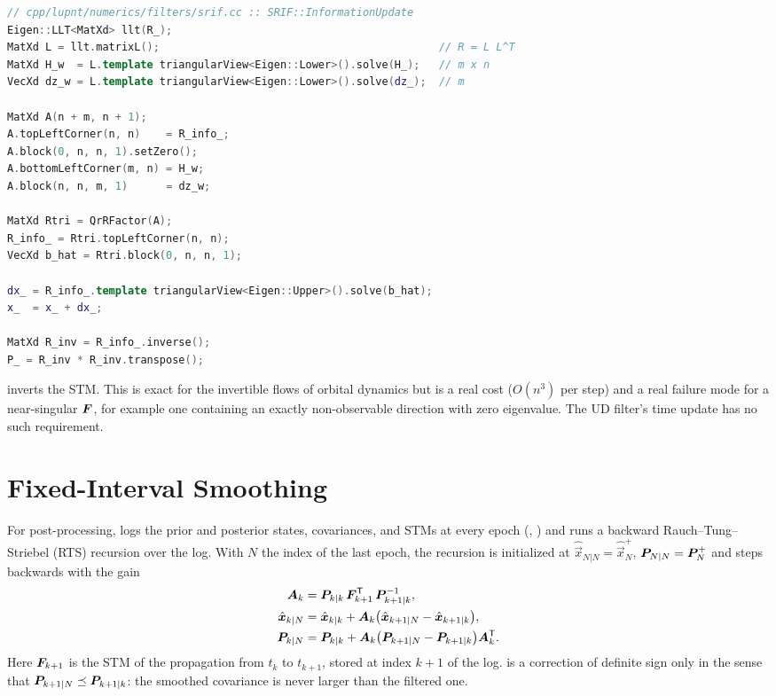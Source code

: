 \begin{lstlisting}[language=cpp, caption={SRIF Householder information update.},
                   label={lst:flt-srif-update}]
// cpp/lupnt/numerics/filters/srif.cc :: SRIF::InformationUpdate
Eigen::LLT<MatXd> llt(R_);
MatXd L = llt.matrixL();                                            // R = L L^T
MatXd H_w  = L.template triangularView<Eigen::Lower>().solve(H_);   // m x n
VecXd dz_w = L.template triangularView<Eigen::Lower>().solve(dz_);  // m

MatXd A(n + m, n + 1);
A.topLeftCorner(n, n)    = R_info_;
A.block(0, n, n, 1).setZero();
A.bottomLeftCorner(m, n) = H_w;
A.block(n, n, m, 1)      = dz_w;

MatXd Rtri = QrRFactor(A);
R_info_ = Rtri.topLeftCorner(n, n);
VecXd b_hat = Rtri.block(0, n, n, 1);

dx_ = R_info_.template triangularView<Eigen::Upper>().solve(b_hat);
x_  = x_ + dx_;

MatXd R_inv = R_info_.inverse();
P_ = R_inv * R_inv.transpose();
\end{lstlisting}

\begin{lupntwarning}
 inverts the STM. This is exact for the invertible flows
of orbital dynamics but is a real cost ($O(n^3)$ per step) and a real failure
mode for a near-singular $\bm{F}$, for example one containing an exactly
non-observable direction with zero eigenvalue. The UD filter's time update has
no such requirement.
\end{lupntwarning}

\section{Fixed-Interval Smoothing}
\label{sec:flt-smoother}

For post-processing,  logs the prior and posterior states,
covariances, and STMs at every epoch (,
) and runs a backward Rauch--Tung--Striebel (RTS)
recursion over the log. With $N$ the index of the last epoch, the recursion is
initialized at $\hat{\vec{x}}_{N|N} = \hat{\vec{x}}^{+}_N$,
$\bm{P}_{N|N} = \bm{P}^{+}_N$ and steps backwards with the gain
\begin{align}
  \label{eq:flt-rts-gain}
  \bm{A}_k &= \bm{P}_{k|k}\,\bm{F}_{k+1}^{\mathsf{T}}\,\bm{P}_{k+1|k}^{-1}, \\
  \label{eq:flt-rts-x}
  \hat{\bm{x}}_{k|N} &= \hat{\bm{x}}_{k|k}
    + \bm{A}_k\bigl(\hat{\bm{x}}_{k+1|N} - \hat{\bm{x}}_{k+1|k}\bigr), \\
  \label{eq:flt-rts-p}
  \bm{P}_{k|N} &= \bm{P}_{k|k}
    + \bm{A}_k\bigl(\bm{P}_{k+1|N} - \bm{P}_{k+1|k}\bigr)\bm{A}_k^{\mathsf{T}} .
\end{align}
Here $\bm{F}_{k+1}$ is the STM of the propagation from $t_k$ to $t_{k+1}$,
stored at index $k+1$ of the log.  is a correction of
definite sign only in the sense that
$\bm{P}_{k+1|N} \preceq \bm{P}_{k+1|k}$: the smoothed covariance is never
larger than the filtered one.


